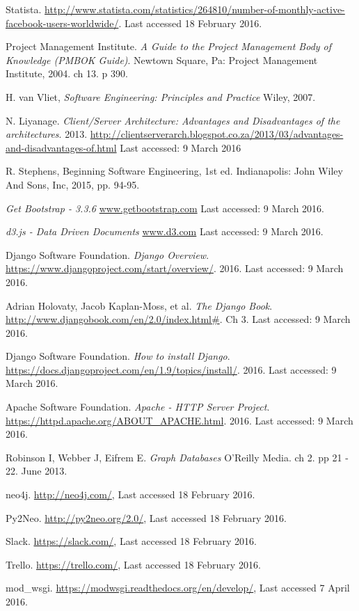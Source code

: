 \documentclass[12pt,onecolumn]{article}
\begin{document}
\begin{thebibliography}{1}
	 Statista. \url {http://www.statista.com/statistics/264810/number-of-monthly-active-facebook-users-worldwide/}. Last accessed 18 February 2016. 

	 Project Management Institute. \emph{A Guide to the Project Management Body of Knowledge (PMBOK Guide)}. Newtown Square, Pa: Project Management Institute, 2004. ch 13. p 390.


	 H. van Vliet, \emph{Software Engineering: Principles and Practice} Wiley, 2007.
	
	 N. Liyanage. \emph{Client/Server Architecture: Advantages and Disadvantages of the architectures}. 2013. \url{http://clientserverarch.blogspot.co.za/2013/03/advantages-and-disadvantages-of.html} Last accessed: 9 March 2016
	
	 R. Stephens, Beginning Software Engineering, 1st ed. Indianapolis: John Wiley And Sons, Inc, 2015, pp. 94-95.
	
	  \emph{Get Bootstrap - 3.3.6} \url{www.getbootstrap.com} Last accessed: 9 March 2016.
	
	  \emph{d3.js - Data Driven Documents} \url{www.d3.com} Last accessed: 9 March 2016.
	
	 Django Software Foundation. \emph{Django Overview}. \url{https://www.djangoproject.com/start/overview/}. 2016. Last accessed: 9 March 2016. 
	
	 Adrian Holovaty, Jacob Kaplan-Moss, et al. \emph{The Django Book}. \url{http://www.djangobook.com/en/2.0/index.html#}. Ch 3. Last accessed: 9 March 2016.
	
	 Django Software Foundation. \emph{How to install Django}. \url{https://docs.djangoproject.com/en/1.9/topics/install/}. 2016. Last accessed: 9 March 2016.	
	
	 Apache Software Foundation. \emph{Apache - HTTP Server Project}. \url{https://httpd.apache.org/ABOUT_APACHE.html}. 2016. Last accessed: 9 March 2016.	
	
	 Robinson I, Webber J, Eifrem E. \emph{Graph Databases} O'Reilly Media. ch 2. pp 21 - 22. June 2013.

	 neo4j. \url{http://neo4j.com/}, Last accessed 18 February 2016.

	 Py2Neo. \url{http://py2neo.org/2.0/}, Last accessed 18 February 2016.

	 Slack. \url{https://slack.com/}, Last accessed 18 February 2016.

	 Trello. \url{https://trello.com/}, Last accessed 18 February 2016.

	 mod\_wsgi. \url{https://modwsgi.readthedocs.org/en/develop/}, Last accessed 7 April 2016.


\end{thebibliography}
\end{document}
